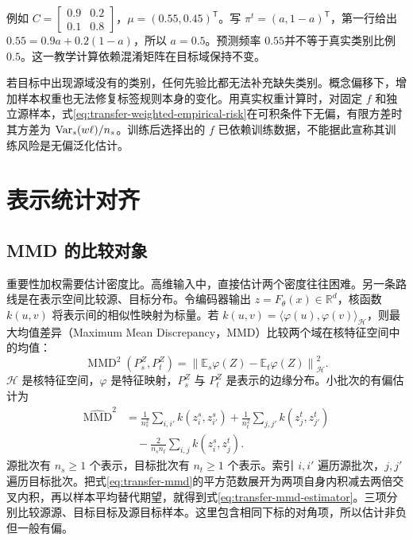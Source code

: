 例如 $C=\begin{bmatrix}0.9&0.2\\0.1&0.8\end{bmatrix}$，$\mu=(0.55,0.45)^{\mathsf T}$。写 $\pi^t=(a,1-a)^{\mathsf T}$，第一行给出 $0.55=0.9a+0.2(1-a)$，所以 $a=0.5$。预测频率 $0.55$并不等于真实类别比例 $0.5$。这一教学计算依赖混淆矩阵在目标域保持不变。

若目标中出现源域没有的类别，任何先验比都无法补充缺失类别。概念偏移下，增加样本权重也无法修复标签规则本身的变化。用真实权重计算时，对固定 $f$ 和独立源样本，式\eqref{eq:transfer-weighted-empirical-risk}在可积条件下无偏，有限方差时其方差为 $\operatorname{Var}_s(w\ell)/n_s$。训练后选择出的 $f$ 已依赖训练数据，不能据此宣称其训练风险是无偏泛化估计。

\section{表示统计对齐}

\subsection{MMD 的比较对象}
重要性加权需要估计密度比。高维输入中，直接估计两个密度往往困难。另一条路线是在表示空间比较源、目标分布。令编码器输出 $z=F_\theta(x)\in\mathbb R^d$，核函数 $k(u,v)$ 将表示间的相似性映射为标量。若 $k(u,v)=\langle\varphi(u),\varphi(v)\rangle_{\mathcal H}$，则最大均值差异（Maximum Mean Discrepancy，MMD）比较两个域在核特征空间中的均值：
\begin{equation}
\operatorname{MMD}^2(P_s^Z,P_t^Z)=
\left\|\mathbb E_s\varphi(Z)-\mathbb E_t\varphi(Z)\right\|_{\mathcal H}^2.
\label{eq:transfer-mmd}
\end{equation}
$\mathcal H$ 是核特征空间，$\varphi$ 是特征映射，$P_s^Z$ 与 $P_t^Z$ 是表示的边缘分布。小批次的有偏估计为
\begin{align}
\widehat{\operatorname{MMD}}^2
&=\frac1{n_s^2}\sum_{i,i'}k(z_i^s,z_{i'}^s)
+\frac1{n_t^2}\sum_{j,j'}k(z_j^t,z_{j'}^t)\\
&\quad-\frac2{n_sn_t}\sum_{i,j}k(z_i^s,z_j^t).
\label{eq:transfer-mmd-estimator}
\end{align}
源批次有 $n_s\geq1$ 个表示，目标批次有 $n_t\geq1$ 个表示。索引 $i,i'$ 遍历源批次，$j,j'$ 遍历目标批次。把式\eqref{eq:transfer-mmd}的平方范数展开为两项自身内积减去两倍交叉内积，再以样本平均替代期望，就得到式\eqref{eq:transfer-mmd-estimator}。三项分别比较源源、目标目标及源目标样本。这里包含相同下标的对角项，所以估计非负但一般有偏。

